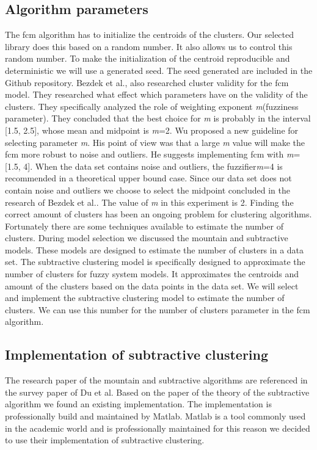 \documentclass[../../main]{subfiles}
\begin{document}
\subsection{Algorithm parameters}
The \acrshort{fcm} algorithm has to initialize the centroids of the clusters.
Our selected library does this based on a random number.
It also allows us to control this random number.
To make the initialization of the centroid reproducible and deterministic we will use a generated seed.
The seed generated are included in the Github repository\cite{rbasarat-repo}.
\newline
Bezdek et al., also researched cluster validity for the \acrshort{fcm} model\cite{Bezdek1995OnModel}.
They researched what effect which parameters have on the validity of the clusters.
They specifically analyzed the role of weighting exponent \textit{m}(fuzziness parameter).
They concluded that the best choice for \textit{m} is probably in the interval [1.5, 2.5], whose mean and midpoint is \textit{m}=2.
Wu proposed a new guideline for selecting parameter \textit{m}\cite{Wu2012}.
His point of view was that a large \textit{m} value will make the \acrlong{fcm} more robust to noise and outliers.
He suggests implementing \acrlong{fcm} with \textit{m}=[1.5, 4].
When the data set contains noise and outliers, the fuzzifier\textit{m}=4 is recommended in a theoretical upper bound case.
Since our data set does not contain noise and outliers we choose to select the midpoint concluded in the research of Bezdek et al.\cite{Bezdek1995OnModel}.
The value of \textit{m} in this experiment is 2.
\newline
Finding the correct amount of clusters has been an ongoing problem for clustering algorithms\cite{Du2010Clustering:Approach}.
Fortunately there are some techniques available to estimate the number of clusters.
During model selection we discussed the mountain and subtractive models. 
These models are designed to estimate the number of clusters in a data set.
The subtractive clustering model is specifically designed to approximate the number of clusters for fuzzy system models\cite{Chiu1994FuzzyEstimation}.
It approximates the centroids and amount of the clusters based on the data points in the data set\cite{Chiu1994FuzzyEstimation}.
We will select and implement the subtractive clustering model to estimate the number of clusters.
We can use this number for the number of clusters parameter in the \acrshort{fcm} algorithm.

\subsection{Implementation of subtractive clustering}
The research paper of the mountain and subtractive algorithms are referenced in the survey paper of Du et al\cite{Du2010Clustering:Approach}.
Based on the paper of the theory of the subtractive algorithm\cite{Chiu1994FuzzyEstimation} we found an existing implementation\cite{matlabSubtractive}.
The implementation is professionally build and maintained by Matlab\cite{matlabSubtractive}.
Matlab is a tool commonly used in the academic world and is professionally maintained for this reason we decided to use their implementation of subtractive clustering.
\end{document}
